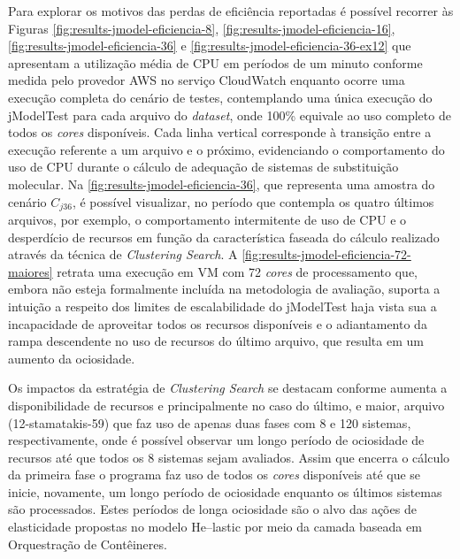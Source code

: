 \documentclass[english,brazilian]{UNISINOSmonografia} %
\begin{document}
Para explorar os motivos das perdas de eficiência reportadas é possível recorrer às Figuras \ref{fig:results-jmodel-eficiencia-8}, \ref{fig:results-jmodel-eficiencia-16}, \ref{fig:results-jmodel-eficiencia-36} e \ref{fig:results-jmodel-eficiencia-36-ex12} que
apresentam a utilização média de CPU em períodos de um minuto conforme medida pelo provedor AWS no serviço CloudWatch enquanto ocorre uma execução completa do cenário de testes, contemplando uma única execução do jModelTest para cada arquivo do \textit{dataset}, onde 100\% equivale ao uso completo de todos os \textit{cores} disponíveis.
%
Cada linha vertical corresponde à transição entre a execução referente a um arquivo e o próximo, evidenciando o comportamento do uso de CPU durante o cálculo de adequação de sistemas de substituição molecular.
%
Na \autoref{fig:results-jmodel-eficiencia-36}, que representa uma amostra do cenário $C_{j36}$, é possível visualizar, no período que contempla os quatro últimos arquivos, por exemplo, o comportamento intermitente de uso de CPU e o desperdício de recursos em função da característica faseada do cálculo realizado através da técnica de \textit{Clustering Search}.
%
A \autoref{fig:results-jmodel-eficiencia-72-maiores} retrata uma execução em VM com 72 \textit{cores} de processamento que, embora não esteja formalmente incluída na metodologia de avaliação, suporta a intuição a respeito dos limites de escalabilidade do jModelTest haja vista sua a incapacidade de aproveitar todos os recursos disponíveis e o adiantamento da rampa descendente no uso de recursos do último arquivo, que resulta em um aumento da ociosidade. 



Os impactos da estratégia de \textit{Clustering Search} se destacam conforme aumenta a disponibilidade de recursos e principalmente no caso do último, e maior, arquivo (12-stamatakis-59) que faz uso de apenas duas fases com 8 e 120 sistemas, respectivamente, onde é possível observar um longo período de ociosidade de recursos até que todos os 8 sistemas sejam avaliados.
%
Assim que encerra o cálculo da primeira fase o programa faz uso de todos os \textit{cores} disponíveis até que se inicie, novamente, um longo período de ociosidade enquanto os últimos sistemas são processados.
%
Estes períodos de longa ociosidade são o alvo das ações de elasticidade propostas no modelo \textsf{He}--lastic por meio da camada baseada em Orquestração de Contêineres.
\end{document}
